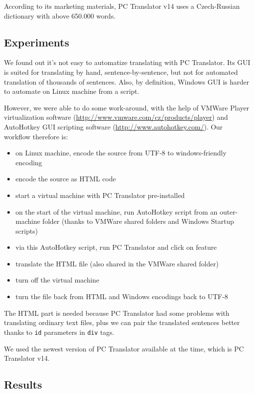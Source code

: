 According to its marketing materials, PC Translator v14 uses a Czech-Russian dictionary with above 650.000 words.

\subsection{Experiments}
We found out it's not easy to automatize translating with PC Translator. Its GUI is suited for translating by hand, sentence-by-sentence, but not for automated translation of thousands of sentences. Also, by definition, Windows GUI is harder to automate on Linux machine from a script.

However, we were able to do some work-around, with the help of VMWare Player virtualization software (\url{http://www.vmware.com/cz/products/player}) and AutoHotkey GUI scripting software (\url{http://www.autohotkey.com/}). Our workflow therefore is:

\begin{itemize}
\item on Linux machine, encode the source from UTF-8 to windows-friendly encoding
\item encode the source as HTML code
\item start a virtual machine with PC Translator pre-installed
\item on the start of the virtual machine, run AutoHotkey script from an outer-machine folder (thanks to VMWare shared folders and Windows Startup scripts)
\item via this AutoHotkey script, run PC Translator and click on  feature 
\item translate the HTML file (also shared in the VMWare shared folder)
\item turn off the virtual machine
\item turn the file back from HTML and Windows encodings back to UTF-8
\end{itemize}

The HTML part is needed because PC Translator had some problems with translating ordinary text files, plus we can pair the translated sentences better thanks to \texttt{id} parameters in \texttt{div} tags.

We used the newest version of PC Translator available at the time, which is PC Translator v14.



\subsection{Results}
